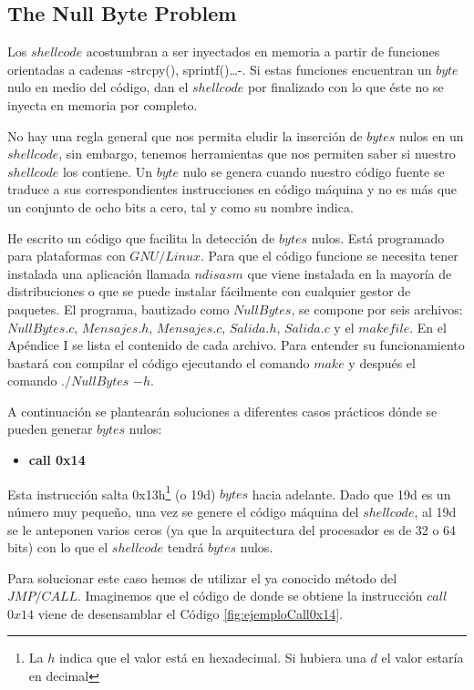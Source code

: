 \documentclass [titlepage, 12pt]{article}
\begin{document}
\subsection{The Null Byte Problem}
Los $shellcode$ acostumbran a ser inyectados en memoria a partir de funciones orientadas a cadenas -strcpy(), sprintf()\ldots-. Si estas funciones encuentran un $byte$ nulo en medio del c\'odigo, dan el $shellcode$ por finalizado con lo que \'este no se inyecta en memoria por completo.\bigskip

No hay una regla general que nos permita eludir la inserci\'on de $bytes$ nulos en un $shellcode$, sin embargo, tenemos herramientas que nos permiten saber si nuestro $shellcode$ los contiene. Un $byte$ nulo se genera cuando nuestro c\'odigo fuente se traduce a sus correspondientes instrucciones en c\'odigo m\'aquina y no es m\'as que un conjunto de ocho bits a cero, tal y como su nombre indica.\bigskip 

He escrito un c\'odigo que facilita la detecci\'on de $bytes$ nulos. Est\'a programado para plataformas con $GNU/Linux$. Para que el c\'odigo funcione se necesita tener instalada una aplicaci\'on llamada $ndisasm$ que viene instalada en la mayor\'ia de distribuciones o que se puede instalar f\'acilmente con cualquier gestor de paquetes. El programa, bautizado como $NullBytes$, se compone por seis archivos: $NullBytes.c$, $Mensajes.h$, $Mensajes.c$, $Salida.h$, $Salida.c$ y el $makefile$. En el Ap\'endice I se lista el contenido de cada archivo. Para entender su funcionamiento bastar\'a con compilar el c\'odigo ejecutando el comando $make$ y despu\'es el comando $./NullBytes$ $-h$.\bigskip

A continuaci\'on se plantear\'an soluciones a diferentes casos pr\'acticos d\'onde se pueden generar $bytes$ nulos:
\begin{itemize}
	\item \textbf{call 0x14}
\end{itemize}
Esta instrucci\'on salta 0x13h\footnote{La $h$ indica que el valor est\'a en hexadecimal. Si hubiera una $d$ el valor estar\'ia en decimal} (o 19d) $bytes$ hacia adelante. Dado que 19d es un n\'umero muy peque\~no, una vez se genere el c\'odigo m\'aquina del $shellcode$, al 19d se le anteponen varios ceros (ya que la arquitectura del procesador es de 32 o 64 bits) con lo que el $shellcode$ tendr\'a $bytes$ nulos.\bigskip

Para solucionar este caso hemos de utilizar el ya conocido m\'etodo del $JMP/CALL$. Imaginemos que el c\'odigo de donde se obtiene la instrucci\'on $call$ $0x14$ viene de desensamblar el C\'odigo \ref{fig:ejemploCall0x14}.
\end{document}
